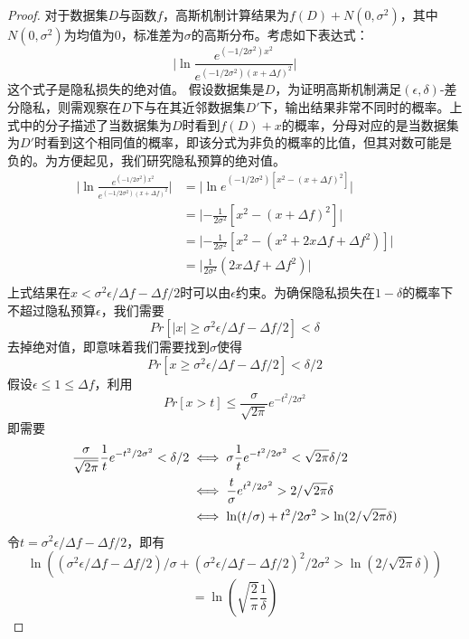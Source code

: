 \begin{proof}
	对于数据集$D$与函数$f$，高斯机制计算结果为$f(D)+N(0,\sigma^2)$，其中$N(0,\sigma^2)$为均值为0，标准差为$\sigma$的高斯分布。考虑如下表达式：
	\begin{equation}
		\lvert \ln\frac{e^{(-1/2\sigma^2)x^2}}{e^{(-1/2\sigma^2)(x+\Delta f)^2}}\rvert
	\end{equation}
	这个式子是隐私损失的绝对值。
	假设数据集是$D$，为证明高斯机制满足$(\epsilon,\delta)$-差分隐私，则需观察在$D$下与在其近邻数据集$D'$下，输出结果非常不同时的概率。上式中的分子描述了当数据集为$D$时看到$f(D)+x$的概率，分母对应的是当数据集为$D'$时看到这个相同值的概率，即该分式为非负的概率的比值，但其对数可能是负的。为方便起见，我们研究隐私预算的绝对值。
	\begin{equation}
		\begin{aligned}
			\lvert \ln\frac{e^{(-1/2\sigma^2)x^2}}{e^{(-1/2\sigma^2)(x+\Delta f)^2}}\rvert
			& = \lvert \ln e^{(-1/2\sigma^2)[x^2-(x+\Delta f)^2]}\rvert\\
			& = \lvert -\frac{1}{2\sigma^2}[x^2-(x+\Delta f)^2]\rvert\\
			& = \lvert -\frac{1}{2\sigma^2}[x^2-(x^2+2x\Delta f+\Delta f^2)]\rvert\\
			& = \lvert \frac{1}{2\sigma^2}(2x\Delta f+\Delta f^2)\rvert\\
		\end{aligned}
	\end{equation}
	上式结果在$x < \sigma^2\epsilon/\Delta f - \Delta f /2$时可以由$\epsilon$约束。为确保隐私损失在$1-\delta$的概率下不超过隐私预算$\epsilon$，我们需要
	$$Pr[|x|\geq \sigma^2\epsilon/\Delta f - \Delta f /2] < \delta$$
	去掉绝对值，即意味着我们需要找到$\sigma$使得
	$$Pr[x\geq \sigma^2\epsilon/\Delta f - \Delta f /2] < \delta / 2$$
	假设$\epsilon \leq 1\leq \Delta f$，利用
	$$Pr[x>t]\leq \frac{\sigma}{\sqrt{2\pi}}e^{-t^2/2\sigma^2}$$
	即需要
	\begin{equation}
		\begin{aligned}
			\frac{\sigma}{\sqrt{2\pi}}\frac{1}{t}e^{-t^2/2\sigma^2} < \delta / 2
			& \iff \sigma\frac{1}{t}e^{-t^2/2\sigma^2} < \sqrt{2\pi}\delta / 2\\
			& \iff \frac{t}{\sigma}e^{t^2/2\sigma^2} > 2/\sqrt{2\pi}\delta\\
			& \iff \ln(t/\sigma)+t^2/2\sigma^2>\ln(2/\sqrt{2\pi}\delta)\notag\\ 
		\end{aligned}
	\end{equation}
	令$t=\sigma^2\epsilon/\Delta f-\Delta f/2$，即有
	$$\ln((\sigma^2\epsilon/\Delta f-\Delta f/2)/\sigma+(\sigma^2\epsilon/\Delta f-\Delta f/2)^2/2\sigma^2>\ln(2/\sqrt{2\pi}\delta))$$
	$$=\ln(\sqrt{\frac{2}{\pi}}\frac{1}{\delta})$$
	

\end{proof}
